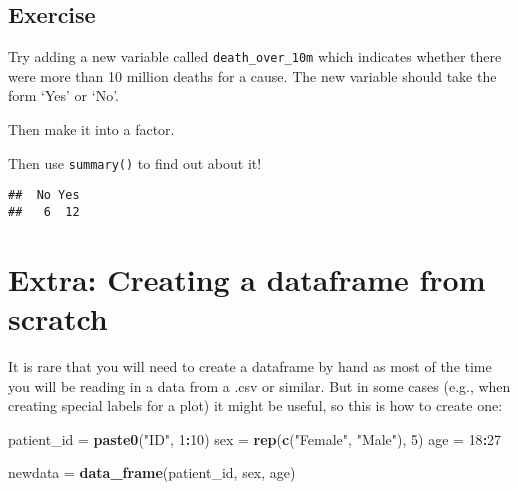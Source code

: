\documentclass[]{book}
\makeatletter
\newenvironment{Shaded}{\begin{snugshade}}{\end{snugshade}}
\newcommand{\KeywordTok}[1]{\textcolor[rgb]{0.13,0.29,0.53}{\textbf{#1}}}
\newcommand{\DataTypeTok}[1]{\textcolor[rgb]{0.13,0.29,0.53}{#1}}
\newcommand{\DecValTok}[1]{\textcolor[rgb]{0.00,0.00,0.81}{#1}}
\newcommand{\StringTok}[1]{\textcolor[rgb]{0.31,0.60,0.02}{#1}}
\newcommand{\CommentTok}[1]{\textcolor[rgb]{0.56,0.35,0.01}{\textit{#1}}}
\newcommand{\OperatorTok}[1]{\textcolor[rgb]{0.81,0.36,0.00}{\textbf{#1}}}
\newcommand{\NormalTok}[1]{#1}
\newenvironment{kframe}{%
\medskip{}
\setlength{\fboxsep}{.8em}
 \def\at@end@of@kframe{}%
 \ifinner\ifhmode%
  \def\at@end@of@kframe{\end{minipage}}%
  \begin{minipage}{\columnwidth}%
 \fi\fi%
 \def\FrameCommand##1{\hskip\@totalleftmargin \hskip-\fboxsep
 \colorbox{shadecolor}{##1}\hskip-\fboxsep
     \hskip-\linewidth \hskip-\@totalleftmargin \hskip\columnwidth}%
 \MakeFramed {\advance\hsize-\width
   \@totalleftmargin\z@ \linewidth\hsize
   \@setminipage}}%
 {\par\unskip\endMakeFramed%
 \at@end@of@kframe}
\renewenvironment{Shaded}{\begin{kframe}}{\end{kframe}}
\theoremstyle{definition}
\theoremstyle{definition}
\theoremstyle{definition}
\theoremstyle{remark}
\makeatother
\begin{document}
\subsection{Exercise}\label{exercise-14}

Try adding a new variable called \texttt{death\_over\_10m} which
indicates whether there were more than 10 million deaths for a cause.
The new variable should take the form `Yes' or `No'.

Then make it into a factor.

Then use \texttt{summary()} to find out about it!

\begin{Shaded}
\end{Shaded}

\begin{verbatim}
##  No Yes 
##   6  12
\end{verbatim}

\section{Extra: Creating a dataframe from
scratch}\label{extra-creating-a-dataframe-from-scratch}

It is rare that you will need to create a dataframe by hand as most of
the time you will be reading in a data from a .csv or similar. But in
some cases (e.g., when creating special labels for a plot) it might be
useful, so this is how to create one:

\begin{Shaded}
\begin{Highlighting}[]
\NormalTok{patient_id =}\StringTok{ }\KeywordTok{paste0}\NormalTok{(}\StringTok{"ID"}\NormalTok{, }\DecValTok{1}\OperatorTok{:}\DecValTok{10}\NormalTok{)}
\NormalTok{sex        =}\StringTok{ }\KeywordTok{rep}\NormalTok{(}\KeywordTok{c}\NormalTok{(}\StringTok{"Female"}\NormalTok{, }\StringTok{"Male"}\NormalTok{), }\DecValTok{5}\NormalTok{)}
\NormalTok{age        =}\StringTok{ }\DecValTok{18}\OperatorTok{:}\DecValTok{27}

\NormalTok{newdata =}\StringTok{ }\KeywordTok{data_frame}\NormalTok{(patient_id, sex, age)}
\end{Highlighting}
\end{Shaded}
\end{document}
